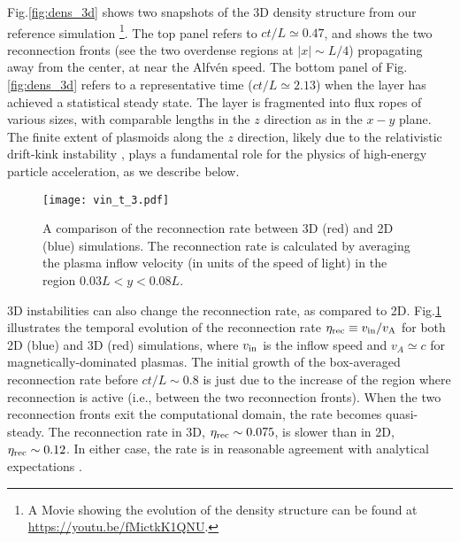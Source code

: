 \documentclass[twocolumn,twocolappendix]{aastex63}
\newcommand{\ls}{\textcolor{teal}}
\newcommand{\hz}{\textcolor{orange}}
\begin{document}
Fig.\ref{fig:dens_3d} shows two snapshots of the 3D density structure from our reference simulation \footnote{A Movie showing the evolution of the density structure can be found at \url{https://youtu.be/fMictkK1QNU}.}. The top panel refers to $ct/L\simeq 0.47$, and shows the two reconnection fronts (see the two overdense regions at $|x|\sim L/4$) propagating away from the center, at near the Alfv\'{e}n speed. The bottom panel of Fig.\ref{fig:dens_3d} refers to a representative time ($ct/L\simeq 2.13$) when the layer has achieved a statistical steady state. The layer is fragmented into flux ropes of various sizes, with comparable lengths in the $z$ direction as in the $x-y$ plane. The finite extent of plasmoids along the $z$ direction, likely due to the relativistic drift-kink instability  \citep{zenitani_07, zenitani_08}, plays a fundamental role for the physics of high-energy particle acceleration, as we describe below.

\begin{figure}
    \texttt{[image: vin\_t\_3.pdf]}
    \caption{A comparison of the reconnection rate between 3D (red) and 2D (blue) simulations. The reconnection rate is calculated by averaging the plasma inflow velocity (in units of the speed of light) in the region $0.03L<y<0.08L$.}
    \label{fig:vin}
\end{figure}

3D instabilities can also change the reconnection rate, as compared to  2D. Fig.\ref{fig:vin} illustrates the temporal evolution of the reconnection rate $\eta_{\rm rec}\equiv v_{\rm in}/v_{\rm A}$ for both  2D (blue) and 3D (red) simulations, where $v_{\rm in}$ is the inflow speed and $v_A \simeq c$ for magnetically-dominated plasmas. The initial growth of the box-averaged reconnection rate before $ct/L\sim 0.8$ is just due to the increase of the region where reconnection is active (i.e., between the two reconnection fronts). 
When the two reconnection fronts exit the computational domain, the rate becomes quasi-steady. The reconnection rate in 3D, $\eta_{\rm rec}\sim0.075$, is slower than in 2D, $\eta_{\rm rec}\sim0.12$. 
In either case, the rate is in reasonable agreement with analytical expectations \citep{lyubarsky_05}.
\end{document}
